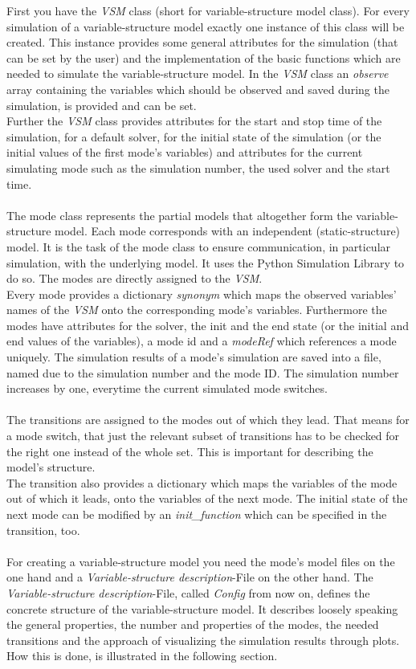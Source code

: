 First you have the \textit{VSM} class (short for variable-structure model class). For every simulation of a variable-structure model exactly one instance of this class will be created. This instance provides some general attributes for the simulation (that can be set by the user) and the implementation of the basic functions which are needed to simulate the variable-structure model. In the \textit{VSM} class an \textit{observe} array containing the variables which should be observed and saved during the simulation, is provided and can be set.\\
Further the \textit{VSM} class provides attributes for the start and stop time of the simulation, for a default solver, for the initial state of the simulation (or the initial values of the first mode's variables) and attributes for the current simulating mode such as the simulation number, the used solver and the start time. \\
\\
The mode class represents the partial models that altogether form the variable-structure model.
Each mode corresponds with an independent (static-structure) model.
It is the task of the mode class to ensure communication, in particular simulation, with the underlying model.
It uses the Python Simulation Library to do so.
The modes are directly assigned to the \textit{VSM}.\\
Every mode provides a dictionary \textit{synonym} which maps the observed variables' names of the \textit{VSM} onto the corresponding mode's variables. Furthermore the modes have attributes for the solver, the init and the end state (or the initial and end values of the variables), a mode id and a \textit{modeRef} which references a mode uniquely. The simulation results of a mode's simulation are saved into a file, named due to the simulation number and the mode ID. The simulation number increases by one, everytime the current simulated mode switches. \\
\\
The transitions are assigned to the modes out of which they lead.
That means for a mode switch, that just the relevant subset of transitions has to be checked for the right one instead of the whole set. This is important for describing the model's structure.\\
The transition also provides a dictionary which maps the variables of the mode out of which it leads, onto the variables of the next mode. The initial state of the next mode can be modified by an \textit{init\_function} which can be specified in the transition, too.\\
\\
For creating a variable-structure model you need the mode's model files on the one hand and a \textit{Variable-structure description}-File on the other hand. The \textit{Variable-structure description}-File, called \textit{Config} from now on, defines the concrete structure of the variable-structure model. It describes loosely speaking the general properties, the number and properties of the modes, the needed transitions and the approach of visualizing the simulation results through plots. How this is done, is illustrated in the following section.

